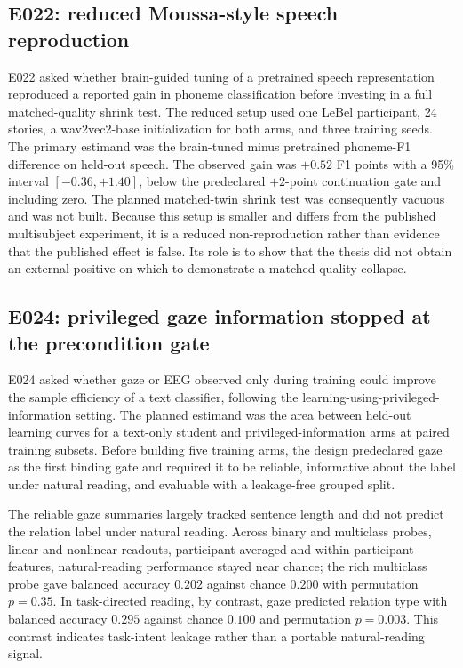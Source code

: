 \subsection{E022: reduced Moussa-style speech reproduction}
\label{sec:e022}

E022 asked whether brain-guided tuning of a pretrained speech representation reproduced a reported gain in phoneme classification before investing in a full matched-quality shrink test.
The reduced setup used one LeBel participant, 24 stories, a wav2vec2-base initialization for both arms, and three training seeds.
The primary estimand was the brain-tuned minus pretrained phoneme-F1 difference on held-out speech.
The observed gain was $+0.52$ F1 points with a 95\% interval $[-0.36,+1.40]$, below the predeclared $+2$-point continuation gate and including zero. 
The planned matched-twin shrink test was consequently vacuous and was not built.
Because this setup is smaller and differs from the published multisubject experiment, it is a reduced non-reproduction rather than evidence that the published effect is false.
Its role is to show that the thesis did not obtain an external positive on which to demonstrate a matched-quality collapse.

\subsection{E024: privileged gaze information stopped at the precondition gate}
\label{sec:e024}

E024 asked whether gaze or EEG observed only during training could improve the sample efficiency of a text classifier, following the learning-using-privileged-information setting.
The planned estimand was the area between held-out learning curves for a text-only student and privileged-information arms at paired training subsets.
Before building five training arms, the design predeclared gaze as the first binding gate and required it to be reliable, informative about the label under natural reading, and evaluable with a leakage-free grouped split.

The reliable gaze summaries largely tracked sentence length and did not predict the relation label under natural reading.
Across binary and multiclass probes, linear and nonlinear readouts, participant-averaged and within-participant features, natural-reading performance stayed near chance; the rich multiclass probe gave balanced accuracy $0.202$ against chance $0.200$ with permutation $p=0.35$. 
In task-directed reading, by contrast, gaze predicted relation type with balanced accuracy $0.295$ against chance $0.100$ and permutation $p=0.003$. 
This contrast indicates task-intent leakage rather than a portable natural-reading signal.

